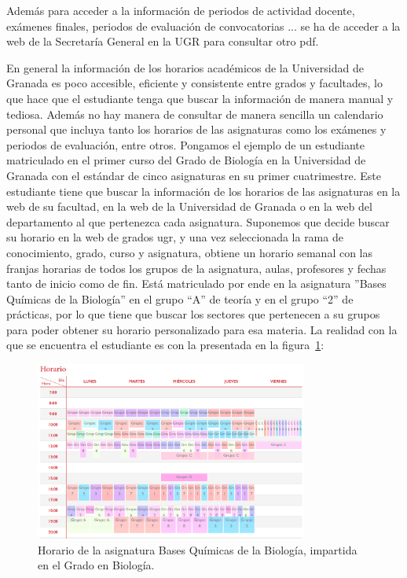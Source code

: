 Además para acceder a la información de periodos de actividad docente, exámenes finales, periodos de evaluación de convocatorias ... se ha de acceder a la web de la Secretaría General en la UGR \cite{webSecretaria} para consultar otro pdf.

En general la información de los horarios académicos de la Universidad de Granada es poco accesible, eficiente y consistente entre grados y facultades, lo que hace que el estudiante tenga que buscar la información de manera manual y tediosa.
Además no hay manera de consultar de manera sencilla un calendario personal que incluya tanto los horarios de las asignaturas como los exámenes y periodos de evaluación, entre otros.
\newline\newline
Pongamos el ejemplo de un estudiante matriculado en el primer curso del Grado de Biología en la Universidad de Granada con el estándar de cinco asignaturas en su primer cuatrimestre. 
Este estudiante tiene que buscar la información de los horarios de las asignaturas en la web de su facultad, en la web de la Universidad de Granada o en la web del departamento al que pertenezca cada asignatura.
Suponemos que decide buscar su horario en la web de grados ugr, y una vez seleccionada la rama de conocimiento, grado, curso y asignatura, obtiene un horario semanal con las franjas horarias de todos los grupos de la asignatura, aulas, profesores y fechas tanto de inicio como de fin.
Está matriculado por ende en la asignatura ''Bases Químicas de la Biología'' en el grupo ``A'' de teoría y en el grupo ``2'' de prácticas, por lo que tiene que buscar los sectores que pertenecen a su grupos para poder obtener su horario personalizado para esa materia.
La realidad con la que se encuentra el estudiante es con la presentada en la figura~\ref{fig:horario_biologia}:

\begin{figure}[H]
    \centering
    \includegraphics[width=0.8\textwidth]{figures/02_horario_biologia.png}
    \caption{Horario de la asignatura Bases Químicas de la Biología, impartida en el Grado en Biología.}
    \label{fig:horario_biologia}
\end{figure}

